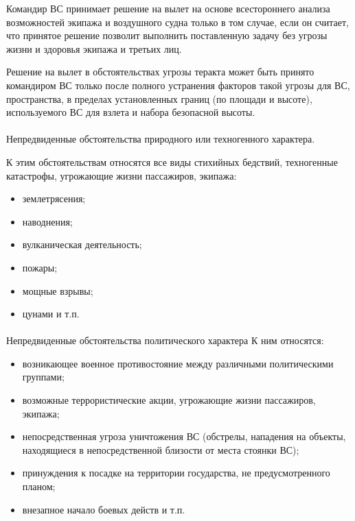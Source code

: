 Командир ВС принимает решение на вылет на основе всестороннего анализа возможностей экипажа и воздушного судна только в том случае, если он считает, что принятое решение позволит выполнить поставленную задачу без угрозы жизни и здоровья экипажа и третьих лиц. 

Решение на вылет в обстоятельствах угрозы теракта может быть принято командиром ВС только после полного устранения факторов такой угрозы для ВС, пространства, в пределах установленных границ (по площади и высоте), используемого ВС для взлета и набора безопасной высоты. 

\paragraph{} Непредвиденные обстоятельства природного или техногенного характера.

К этим обстоятельствам относятся все виды стихийных бедствий, техногенные катастрофы, угрожающие жизни пассажиров, экипажа: 
\begin{itemize}
    \item землетрясения;
    \item наводнения;
    \item вулканическая деятельность; 
    \item пожары;
    \item мощные взрывы;
    \item цунами и т.п.
\end{itemize}
 
\paragraph{} Непредвиденные обстоятельства политического характера
К ним относятся:
\begin{itemize}
    \item возникающее военное противостояние между различными политическими группами;
    \item возможные террористические акции, угрожающие жизни пассажиров, экипажа;
    \item непосредственная угроза уничтожения ВС (обстрелы, нападения на объекты, находящиеся в непосредственной близости от места стоянки ВС); 
    \item принуждения к посадке на территории государства, не предусмотренного планом;
    \item внезапное начало боевых действ и т.п.
\end{itemize}
 
